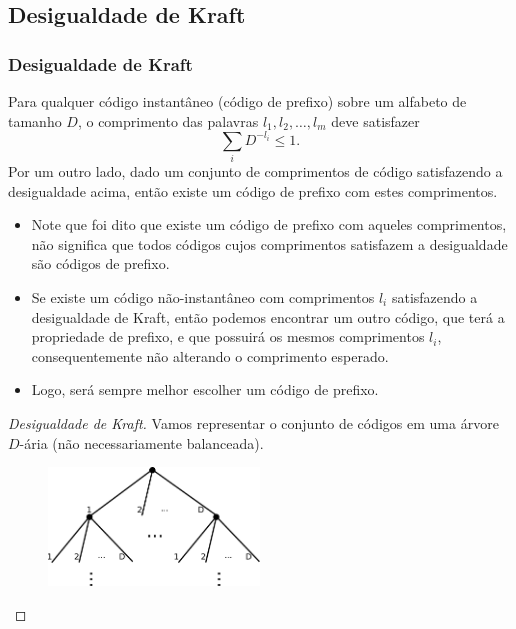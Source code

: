 \subsection{Desigualdade de Kraft}
\begin{frame}[allowframebreaks]
  \frametitle{Desigualdade de Kraft}

  \begin{theorem}
  Para qualquer código instantâneo (código de prefixo) sobre um alfabeto de tamanho $D$, o comprimento
  das palavras $l_1, l_2, \ldots, l_m$ deve satisfazer 
	\begin{equation}
	\sum_i D^{-l_i} \leq 1 .
	\end{equation}
  Por um outro lado, dado um conjunto de comprimentos de código satisfazendo a desigualdade acima,
  então existe um código de prefixo com estes comprimentos.
  \end{theorem}

  \begin{itemize}
  \item Note que foi dito que existe um código de prefixo com aqueles comprimentos, não significa que todos códigos
	cujos comprimentos satisfazem a desigualdade são códigos de prefixo.
  \item Se existe um código não-instantâneo com comprimentos $l_i$ satisfazendo a desigualdade de Kraft, então
	podemos encontrar um outro código, que terá a propriedade de prefixo, e que possuirá os mesmos comprimentos $l_i$,
	consequentemente não alterando o comprimento esperado.
  \item Logo, será sempre melhor escolher um código de prefixo.
  \end{itemize}

  \framebreak

  \begin{proof}[Desigualdade de Kraft]
  Vamos representar o conjunto de códigos em uma árvore $D$-ária (não necessariamente balanceada).

  \begin{figure}[h!]
  \centering
  \includegraphics[width=0.5\textwidth]{images/Dtree.pdf}
  \label{fig:Dtree}
  \end{figure}
  

\end{proof}
\end{frame}

